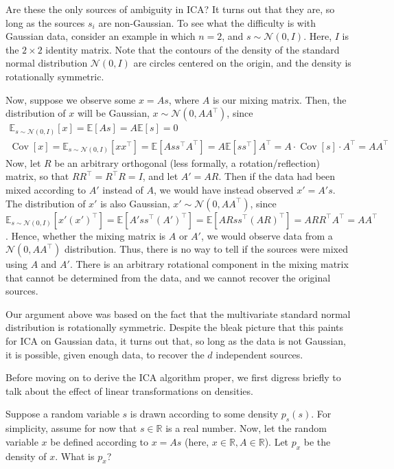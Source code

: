 Are these the only sources of ambiguity in ICA? It turns out that they
are, so long as the sources $s_i$ are non-Gaussian. To see what the difficulty is
with Gaussian data, consider an example in which $n = 2$, and $s \sim \mathcal N(0,I)$.
Here, $I$ is the $2\times2$ identity matrix. Note that the contours of the density of
the standard normal distribution $\mathcal N(0,I)$ are circles centered on the origin,
and the density is rotationally symmetric.

Now, suppose we observe some $x = As$, where $A$ is our mixing matrix.
Then, the distribution of $x$ will be Gaussian, $x \sim \mathcal N(0,AA^\top)$, since
\begin{gather*}
    \mathbb E_{s\sim \mathcal N(0,I)}[x] = \mathbb E[As] = A\mathbb E[s] = 0\\
    \operatorname{Cov}[x] = \mathbb E_{s\sim \mathcal N(0,I)}[xx^\top] = \mathbb E[Ass^\top A^\top] = A\mathbb E[ss^\top]A^\top = A \cdot \operatorname{Cov}[s] \cdot A^\top = AA^\top
\end{gather*}
Now, let $R$ be an arbitrary orthogonal (less formally, a rotation/reflection)
matrix, so that $RR^\top = R^\top R = I$, and let $A' = AR$. Then if the data had
been mixed according to $A'$ instead of $A$, we would have instead observed
$x' = A's$. The distribution of $x'$ is also Gaussian, $x' \sim \mathcal N(0,AA^\top)$, since
$\mathbb E_{s\sim \mathcal N(0,I)}[x' (x' )^\top] = \mathbb E[A' ss^\top(A')^\top] = \mathbb E[ARss^\top(AR)^\top] = ARR^\top A^\top = AA^\top$.
Hence, whether the mixing matrix is $A$ or $A'$, we would observe data from
a $\mathcal N(0,AA^\top)$ distribution. Thus, there is no way to tell if the sources were
mixed using $A$ and $A'$. There is an arbitrary rotational component in the
mixing matrix that cannot be determined from the data, and we cannot
recover the original sources.

Our argument above was based on the fact that the multivariate standard
normal distribution is rotationally symmetric. Despite the bleak picture that
this paints for ICA on Gaussian data, it turns out that, so long as the data is
not Gaussian, it is possible, given enough data, to recover the $d$ independent
sources.


\vspace{1cm}
Before moving on to derive the ICA algorithm proper, we first digress briefly
to talk about the effect of linear transformations on densities.

Suppose a random variable $s$ is drawn according to some density $p_s(s)$.
For simplicity, assume for now that $s \in \mathbb R$ is a real number. Now, let the
random variable $x$ be defined according to $x = As$ (here, $x \in \mathbb R,A \in \mathbb R$). Let
$p_x$ be the density of $x$. What is $p_x$?


